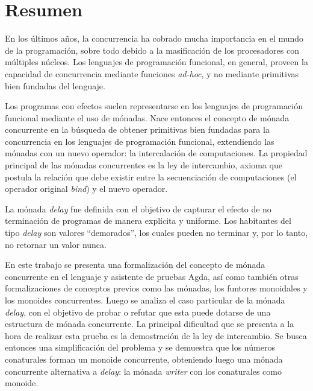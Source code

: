 \chapter*{Resumen}

En los últimos años, la concurrencia ha cobrado mucha importancia en el mundo de la programación, sobre todo debido a la masificación de los procesadores con múltiples núcleos. Los lenguajes de programación funcional, en general, proveen la capacidad de concurrencia mediante funciones \textit{ad-hoc}, y no mediante primitivas bien fundadas del lenguaje. 

Los programas con efectos suelen representarse en los lenguajes de programación funcional mediante el uso de mónadas. Nace entonces el concepto de mónada concurrente en la búsqueda de obtener primitivas bien fundadas para la concurrencia en los lenguajes de programación funcional, extendiendo las mónadas con un nuevo operador: la intercalación de computaciones. La propiedad principal de las mónadas concurrentes es la ley de intercambio, axioma que postula la relación que debe existir entre la secuenciación de computaciones (el operador original \textit{bind}) y el nuevo operador. 
 
La mónada \textit{delay} fue definida con el objetivo de capturar el efecto de no terminación de programas de manera explícita y uniforme. Los habitantes del tipo \textit{delay} son valores ``demorados'', los cuales pueden no terminar y, por lo tanto, no retornar un valor nunca.

En este trabajo se presenta una formalización del concepto de mónada concurrente en el lenguaje y asistente de pruebas Agda, así como también otras formalizaciones de conceptos previos como las mónadas, los funtores monoidales y los monoides concurrentes. Luego se analiza el caso particular de la mónada \textit{delay}, con el objetivo de probar o refutar que esta puede dotarse de una estructura de mónada concurrente. La principal dificultad que se presenta a la hora de realizar esta prueba es la demostración de la ley de intercambio. Se busca entonces una simplificación del problema y se demuestra que los números conaturales forman un monoide concurrente, obteniendo luego una mónada concurrente alternativa a \textit{delay}: la mónada \textit{writer} con los conaturales como monoide.